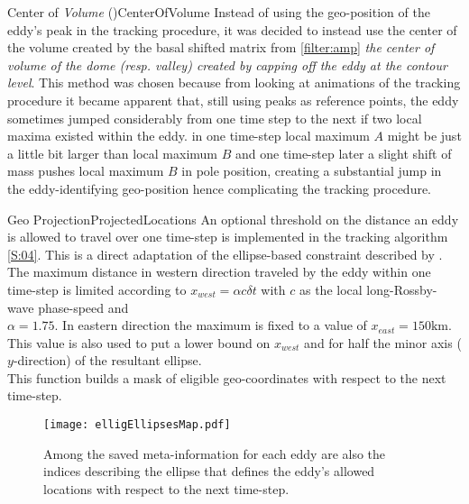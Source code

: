 \begin{filter}{Center of \textit{Volume} (\CoV)}{CenterOfVolume}
\label{filter:CoV}
Instead of using the geo-position of the eddy's peak in the tracking procedure,
it was decided to instead use the center of the volume created by the basal
shifted matrix from \ref{filter:amp} \ie \textit{the center of volume of the
dome
(resp. valley) created by capping off the eddy at the contour level}.
This method was chosen because from looking at animations of the tracking
procedure
it became apparent that, still using peaks as reference points, the eddy
sometimes jumped considerably from one time step to the next if two local maxima
existed within the eddy. \Eg in one time-step local maximum $A$ might be just a
little bit larger than local maximum $B$ and one time-step later a slight shift
of mass pushes local maximum $B$ in pole position, creating a substantial jump
in the eddy-identifying geo-position hence complicating the tracking procedure.
\end{filter}\newline
\begin{filter}{Geo Projection}{ProjectedLocations}
\label{filter:projLocs}
An optional threshold on the distance an eddy is allowed to travel over one time-step is implemented in the tracking algorithm \ref{S:04}. This is a direct adaptation of the ellipse-based constraint described by \citet{Chelton2011}. The maximum distance in western direction traveled by the eddy within one time-step is limited according to $x_{west} = \alpha c \delta{t} $ with $c$ as the local long-Rossby-wave phase-speed and \\ \eg $\alpha=1.75$. In eastern direction the maximum is fixed to a value of \eg $x_{east} = 150\mathrm{km}$. This value is also used to put a lower bound on $x_{west}$ and for half the minor axis ($y$-direction) of the resultant ellipse.   \\
This function builds a mask of eligible geo-coordinates with respect to the next time-step.
\end{filter}\newline

\begin{figure}
		\texttt{[image: elligEllipsesMap.pdf]}
		\caption{Among the saved meta-information for each eddy are also the indices describing the ellipse that defines the eddy's allowed locations with respect to the next time-step.}
		\label{fig:elligEllipse}
\end{figure}
\newpage
